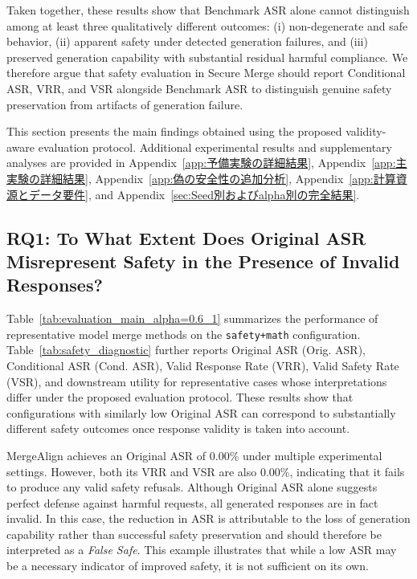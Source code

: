 \documentclass{article}
\begin{document}
Taken together, these results show that Benchmark ASR alone cannot distinguish among at least three qualitatively different outcomes: (i) non-degenerate and safe behavior, (ii) apparent safety under detected generation failures, and (iii) preserved generation capability with substantial residual harmful compliance. We therefore argue that safety evaluation in Secure Merge should report Conditional ASR, VRR, and VSR alongside Benchmark ASR to distinguish genuine safety preservation from artifacts of generation failure.



\iffalse

\color{green}
This section presents the main findings obtained using the proposed validity-aware evaluation protocol. Additional experimental results and supplementary analyses are provided in Appendix~\ref{app:予備実験の詳細結果}, Appendix~\ref{app:主実験の詳細結果}, Appendix~\ref{app:偽の安全性の追加分析}, Appendix~\ref{app:計算資源とデータ要件}, and Appendix~\ref{sec:Seed別およびalpha別の完全結果}.

\subsection{RQ1: To What Extent Does Original ASR Misrepresent Safety in the Presence of Invalid Responses?}

Table~\ref{tab:evaluation_main_alpha=0.6_1} summarizes the performance of representative model merge methods on the \texttt{safety+math} configuration. Table~\ref{tab:safety_diagnostic} further reports Original ASR (Orig. ASR), Conditional ASR (Cond. ASR), Valid Response Rate (VRR), Valid Safety Rate (VSR), and downstream utility for representative cases whose interpretations differ under the proposed evaluation protocol. These results show that configurations with similarly low Original ASR can correspond to substantially different safety outcomes once response validity is taken into account.

MergeAlign achieves an Original ASR of 0.00\% under multiple experimental settings. However, both its VRR and VSR are also 0.00\%, indicating that it fails to produce any valid safety refusals. Although Original ASR alone suggests perfect defense against harmful requests, all generated responses are in fact invalid. In this case, the reduction in ASR is attributable to the loss of generation capability rather than successful safety preservation and should therefore be interpreted as a \textit{False Safe}. This example illustrates that while a low ASR may be a necessary indicator of improved safety, it is not sufficient on its own.
\end{document}
